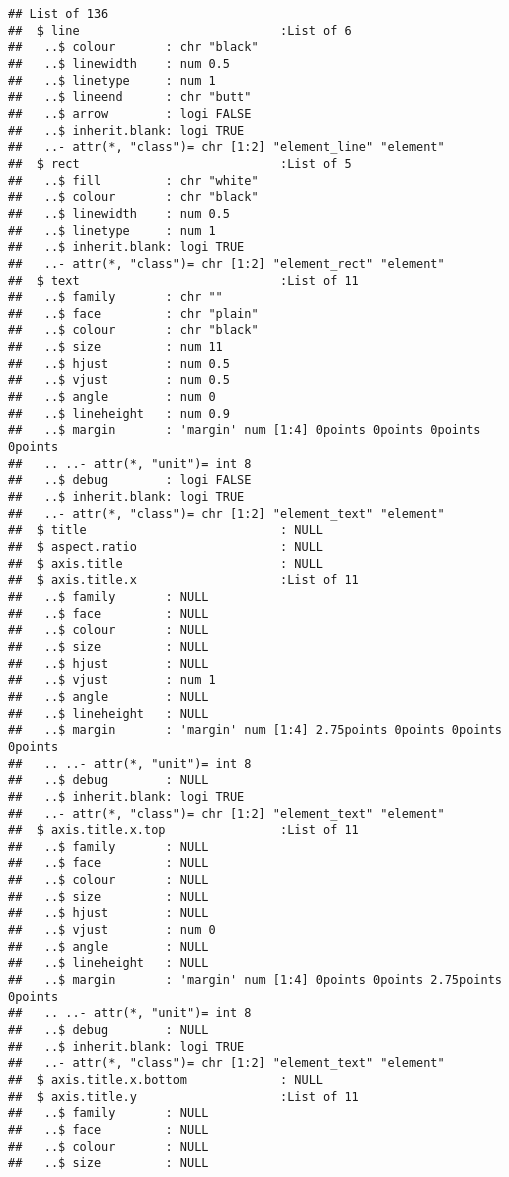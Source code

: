 \documentclass[
]{article}
\begin{document}
\begin{verbatim}
## List of 136
##  $ line                            :List of 6
##   ..$ colour       : chr "black"
##   ..$ linewidth    : num 0.5
##   ..$ linetype     : num 1
##   ..$ lineend      : chr "butt"
##   ..$ arrow        : logi FALSE
##   ..$ inherit.blank: logi TRUE
##   ..- attr(*, "class")= chr [1:2] "element_line" "element"
##  $ rect                            :List of 5
##   ..$ fill         : chr "white"
##   ..$ colour       : chr "black"
##   ..$ linewidth    : num 0.5
##   ..$ linetype     : num 1
##   ..$ inherit.blank: logi TRUE
##   ..- attr(*, "class")= chr [1:2] "element_rect" "element"
##  $ text                            :List of 11
##   ..$ family       : chr ""
##   ..$ face         : chr "plain"
##   ..$ colour       : chr "black"
##   ..$ size         : num 11
##   ..$ hjust        : num 0.5
##   ..$ vjust        : num 0.5
##   ..$ angle        : num 0
##   ..$ lineheight   : num 0.9
##   ..$ margin       : 'margin' num [1:4] 0points 0points 0points 0points
##   .. ..- attr(*, "unit")= int 8
##   ..$ debug        : logi FALSE
##   ..$ inherit.blank: logi TRUE
##   ..- attr(*, "class")= chr [1:2] "element_text" "element"
##  $ title                           : NULL
##  $ aspect.ratio                    : NULL
##  $ axis.title                      : NULL
##  $ axis.title.x                    :List of 11
##   ..$ family       : NULL
##   ..$ face         : NULL
##   ..$ colour       : NULL
##   ..$ size         : NULL
##   ..$ hjust        : NULL
##   ..$ vjust        : num 1
##   ..$ angle        : NULL
##   ..$ lineheight   : NULL
##   ..$ margin       : 'margin' num [1:4] 2.75points 0points 0points 0points
##   .. ..- attr(*, "unit")= int 8
##   ..$ debug        : NULL
##   ..$ inherit.blank: logi TRUE
##   ..- attr(*, "class")= chr [1:2] "element_text" "element"
##  $ axis.title.x.top                :List of 11
##   ..$ family       : NULL
##   ..$ face         : NULL
##   ..$ colour       : NULL
##   ..$ size         : NULL
##   ..$ hjust        : NULL
##   ..$ vjust        : num 0
##   ..$ angle        : NULL
##   ..$ lineheight   : NULL
##   ..$ margin       : 'margin' num [1:4] 0points 0points 2.75points 0points
##   .. ..- attr(*, "unit")= int 8
##   ..$ debug        : NULL
##   ..$ inherit.blank: logi TRUE
##   ..- attr(*, "class")= chr [1:2] "element_text" "element"
##  $ axis.title.x.bottom             : NULL
##  $ axis.title.y                    :List of 11
##   ..$ family       : NULL
##   ..$ face         : NULL
##   ..$ colour       : NULL
##   ..$ size         : NULL

\end{verbatim}
\end{document}

